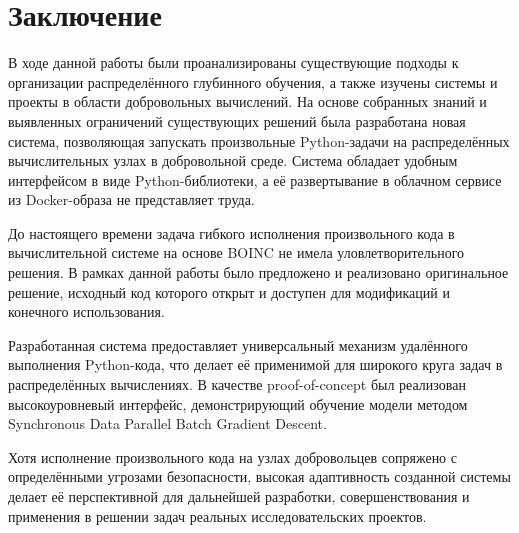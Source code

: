 \documentclass[a4paper,12pt]{extarticle}
\begin{document}
\section{Заключение}

В ходе данной работы были проанализированы существующие подходы к организации распределённого глубинного обучения, а также изучены системы и проекты в области добровольных вычислений. На основе собранных знаний и выявленных ограничений существующих решений была разработана новая система, позволяющая запускать произвольные Python-задачи на распределённых вычислительных узлах в добровольной среде. Система обладает удобным интерфейсом в виде Python-библиотеки, а её развертывание в облачном сервисе из Docker-образа не представляет труда.

До настоящего времени задача гибкого исполнения произвольного кода в вычислительной системе на основе BOINC не имела уловлетворительного решения. В рамках данной работы было предложено и реализовано оригинальное решение, исходный код которого открыт и доступен для модификаций и конечного использования.

Разработанная система предоставляет универсальный механизм удалённого выполнения Python-кода, что делает её применимой для широкого круга задач в распределённых вычислениях. В качестве proof-of-concept был реализован высокоуровневый интерфейс, демонстрирующий обучение модели методом Synchronous Data Parallel Batch Gradient Descent.

Хотя исполнение произвольного кода на узлах добровольцев сопряжено с определёнными угрозами безопасности, высокая адаптивность созданной системы делает её перспективной для дальнейшей разработки, совершенствования и применения в решении задач реальных исследовательских проектов.

\newpage

\printbibliography[heading=bibintoc]
\end{document}

